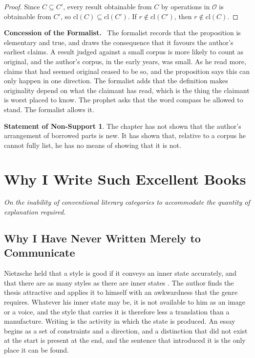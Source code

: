 \documentclass[11pt,openany,twoside]{book}
\theoremstyle{plain}
\theoremstyle{definition}
\newtheorem{nonsupport}{Statement of Non-Support}
\theoremstyle{remark}
\newenvironment{concession}{\par\medskip\noindent\textbf{Concession of the Formalist.}\ }{\par\medskip}
\begin{document}
\begin{proof}
Since $C\subseteq C'$, every result obtainable from $C$ by operations in $\mathcal O$ is obtainable from $C'$, so $\mathrm{cl}(C)\subseteq\mathrm{cl}(C')$. If $r\notin\mathrm{cl}(C')$, then $r\notin\mathrm{cl}(C)$.
\end{proof}

\begin{concession}
The formalist records that the proposition is elementary and true, and draws the consequence that it favours the author's earliest claims. A result judged against a small corpus is more likely to count as original, and the author's corpus, in the early years, was small. As he read more, claims that had seemed original ceased to be so, and the proposition says this can only happen in one direction. The formalist adds that the definition makes originality depend on what the claimant has read, which is the thing the claimant is worst placed to know. The prophet asks that the word compass be allowed to stand. The formalist allows it.
\end{concession}

\begin{nonsupport}
The chapter has not shown that the author's arrangement of borrowed parts is new. It has shown that, relative to a corpus he cannot fully list, he has no means of showing that it is not.
\end{nonsupport}

\part{Why I Write Such Excellent Books}

\begin{center}\emph{On the inability of conventional literary categories to accommodate the quantity of explanation required.}\end{center}

\chapter{Why I Have Never Written Merely to Communicate}

Nietzsche held that a style is good if it conveys an inner state accurately, and that there are as many styles as there are inner states \cite{nietzsche-ecce}. The author finds the thesis attractive and applies it to himself with an awkwardness that the genre requires. Whatever his inner state may be, it is not available to him as an image or a voice, and the style that carries it is therefore less a translation than a manufacture. Writing is the activity in which the state is produced. An essay begins as a set of constraints and a direction, and a distinction that did not exist at the start is present at the end, and the sentence that introduced it is the only place it can be found.
\end{document}
